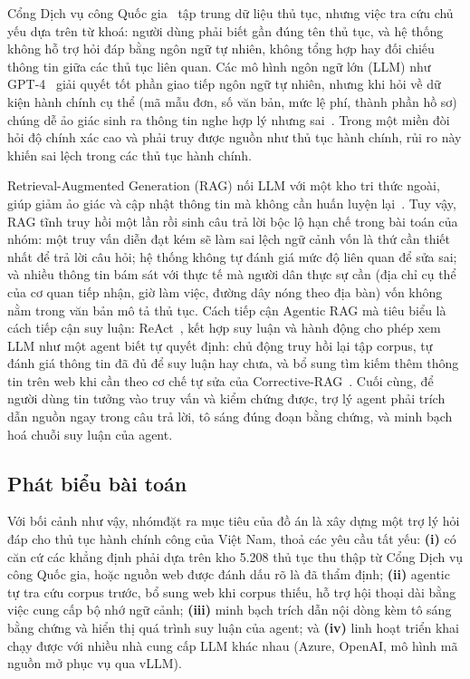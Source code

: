 \documentclass[11pt]{article}
\begin{document}
Cổng Dịch vụ công Quốc gia~\citep{dichvucong} tập trung dữ liệu thủ tục, nhưng việc tra cứu chủ yếu dựa trên từ khoá: người dùng phải biết gần đúng tên thủ tục, và hệ thống không hỗ trợ hỏi đáp bằng ngôn ngữ tự nhiên, không tổng hợp hay đối chiếu thông tin giữa các thủ tục liên quan. Các mô hình ngôn ngữ lớn (LLM) như GPT-4~\citep{openai2023gpt4} giải quyết tốt phần giao tiếp ngôn ngữ tự nhiên, nhưng khi hỏi về dữ kiện hành chính cụ thể (mã mẫu đơn, số văn bản, mức lệ phí, thành phần hồ sơ) chúng dễ ảo giác sinh ra thông tin nghe hợp lý nhưng sai~\citep{ji2023hallucination}. Trong một miền đòi hỏi độ chính xác cao và phải truy được nguồn như thủ tục hành chính, rủi ro này khiến sai lệch trong các thủ tục hành chính.

Retrieval-Augmented Generation (RAG) nối LLM với một kho tri thức ngoài, giúp giảm ảo giác và cập nhật thông tin mà không cần huấn luyện lại~\citep{lewis2020rag,gao2023ragsurvey}. Tuy vậy, RAG tĩnh truy hồi một lần rồi sinh câu trả lời bộc lộ hạn chế trong bài toán của nhóm: một truy vấn diễn đạt kém sẽ làm sai lệch ngữ cảnh vốn là thứ cần thiết nhất để trả lời câu hỏi; hệ thống không tự đánh giá mức độ liên quan để sửa sai; và nhiều thông tin bám sát với thực tế mà người dân thực sự cần (địa chỉ cụ thể của cơ quan tiếp nhận, giờ làm việc, đường dây nóng theo địa bàn) vốn không nằm trong văn bản mô tả thủ tục. Cách tiếp cận Agentic RAG mà tiêu biểu là cách tiếp cận suy luận: ReAct~\citep{yao2023react}, kết hợp suy luận và hành động cho phép xem LLM như một agent biết tự quyết định: chủ động truy hồi lại tập corpus, tự đánh giá thông tin đã đủ để suy luận hay chưa, và bổ sung tìm kiếm thêm thông tin trên web khi cần theo cơ chế tự sửa của Corrective-RAG~\citep{yan2024crag, asai2024selfrag}. Cuối cùng, để người dùng tin tưởng vào truy vấn và kiểm chứng được, trợ lý  agent phải trích dẫn nguồn ngay trong câu trả lời, tô sáng đúng đoạn bằng chứng, và minh bạch hoá chuỗi suy luận của agent.

\subsection{Phát biểu bài toán}

Với bối cảnh như vậy, nhómđặt ra mục tiêu của đồ án là xây dựng một trợ lý hỏi đáp cho thủ tục hành chính công của Việt Nam, thoả các yêu cầu tất yếu: \textbf{(i)} có căn cứ các khẳng định phải dựa trên kho 5.208 thủ tục
thu thập từ Cổng Dịch vụ công Quốc gia, hoặc nguồn web được đánh dấu rõ là đã thẩm định; \textbf{(ii)} agentic tự tra cứu corpus trước, bổ sung web khi corpus thiếu, hỗ trợ hội
thoại dài bằng việc cung cấp bộ nhớ ngữ cảnh; \textbf{(iii)} minh bạch trích dẫn nội dòng kèm tô sáng bằng chứng và hiển thị quá trình suy luận của agent; và \textbf{(iv)} linh hoạt triển khai chạy được với nhiều nhà cung cấp LLM khác nhau (Azure, OpenAI, mô hình mã nguồn mở phục vụ qua vLLM).
\end{document}

